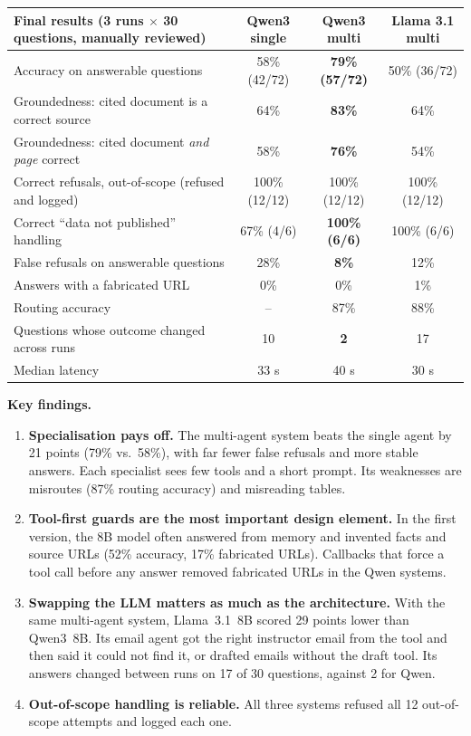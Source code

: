 \documentclass[11pt,a4paper]{article}
\begin{document}
\medskip
\begin{tabularx}{\textwidth}{@{}Yccc@{}}
\toprule
Final results (3 runs $\times$ 30 questions, manually reviewed) & Qwen3 single & \textbf{Qwen3 multi} & Llama 3.1 multi \\ \midrule
Accuracy on answerable questions & 58\% (42/72) & \textbf{79\% (57/72)} & 50\% (36/72) \\
Groundedness: cited document is a correct source & 64\% & \textbf{83\%} & 64\% \\
Groundedness: cited document \emph{and page} correct & 58\% & \textbf{76\%} & 54\% \\
Correct refusals, out-of-scope (refused and logged) & 100\% (12/12) & 100\% (12/12) & 100\% (12/12) \\
Correct ``data not published'' handling & 67\% (4/6) & \textbf{100\% (6/6)} & 100\% (6/6) \\
False refusals on answerable questions & 28\% & \textbf{8\%} & 12\% \\
Answers with a fabricated URL & 0\% & 0\% & 1\% \\
Routing accuracy & -- & 87\% & 88\% \\
Questions whose outcome changed across runs & 10 & \textbf{2} & 17 \\
Median latency & 33 s & 40 s & 30 s \\
\bottomrule
\end{tabularx}

\medskip
\noindent\textbf{Key findings.}
\begin{enumerate}
  \item \textbf{Specialisation pays off.} The multi-agent system beats the single agent by 21 points
        (79\% vs.\ 58\%), with far fewer false refusals and more stable answers. Each specialist sees few tools
        and a short prompt. Its weaknesses are misroutes (87\% routing accuracy) and misreading tables.
  \item \textbf{Tool-first guards are the most important design element.} In the first version, the 8B model
        often answered from memory and invented facts and source URLs (52\% accuracy, 17\% fabricated URLs).
        Callbacks that force a tool call before any answer removed fabricated URLs in the Qwen systems.
  \item \textbf{Swapping the LLM matters as much as the architecture.} With the same multi-agent system,
        Llama~3.1~8B scored 29 points lower than Qwen3~8B. Its email agent got the right instructor email from
        the tool and then said it could not find it, or drafted emails without the draft tool. Its answers
        changed between runs on 17 of 30 questions, against 2 for Qwen.
  \item \textbf{Out-of-scope handling is reliable.} All three systems refused all 12 out-of-scope attempts and
        logged each one.
\end{enumerate}
\end{document}
